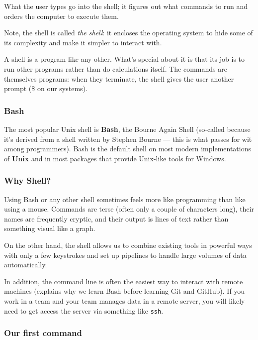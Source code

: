 \documentclass[
  letterpaper,
  DIV=11,
  numbers=noendperiod]{scrreprt}
\begin{document}
What the user types go into the shell; it figures out what commands to
run and orders the computer to execute them.

Note, the shell is called \emph{the shell}: it encloses the operating
system to hide some of its complexity and make it simpler to interact
with.

A shell is a program like any other. What's special about it is that its
job is to run other programs rather than do calculations itself. The
commands are themselves programs: when they terminate, the shell gives
the user another prompt (\$ on our systems).

\hypertarget{bash}{%
\subsubsection*{Bash}\label{bash}}

The most popular Unix shell is \textbf{Bash}, the Bourne Again Shell
(so-called because it's derived from a shell written by Stephen Bourne
--- this is what passes for wit among programmers). Bash is the default
shell on most modern implementations of \textbf{Unix} and in most
packages that provide Unix-like tools for Windows.

\hypertarget{why-shell}{%
\subsubsection*{Why Shell?}\label{why-shell}}

Using Bash or any other shell sometimes feels more like programming than
like using a mouse. Commands are terse (often only a couple of
characters long), their names are frequently cryptic, and their output
is lines of text rather than something visual like a graph.

On the other hand, the shell allows us to combine existing tools in
powerful ways with only a few keystrokes and set up pipelines to handle
large volumes of data automatically.

In addition, the command line is often the easiest way to interact with
remote machines (explains why we learn Bash before learning Git and
GitHub). If you work in a team and your team manages data in a remote
server, you will likely need to get access the server via something like
\texttt{ssh}.

\hypertarget{our-first-command}{%
\subsubsection*{Our first command}\label{our-first-command}}
\end{document}
